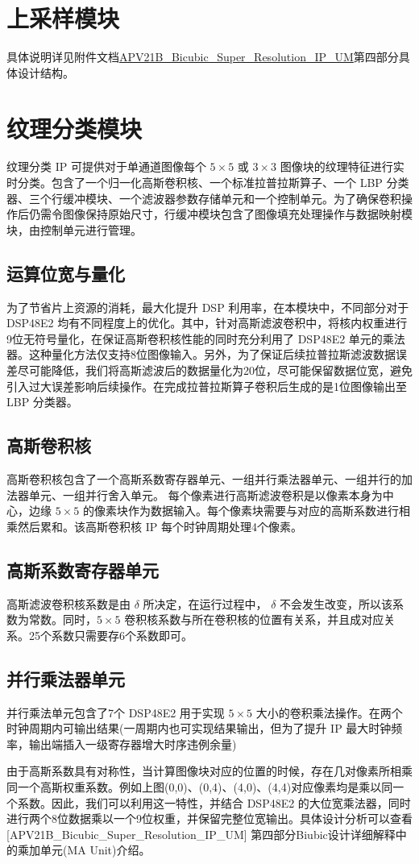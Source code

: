\documentclass[12pt, a4paper, oneside]{ctexbook}
\begin{document}
	\chapter{上采样模块}
	具体说明详见附件文档\href{run:./pic/APV21B_Bicubic_Super_Resolution_IP_UM.pdf}{APV21B\_Bicubic\_Super\_Resolution\_IP\_UM}第四部分具体设计结构。
	
	\chapter{纹理分类模块}
	纹理分类 IP 可提供对于单通道图像每个 $5\times5$ 或 $3\times3$ 图像块的纹理特征进行实时分类。包含了一个归一化高斯卷积核、一个标准拉普拉斯算子、一个 LBP 分类器、三个行缓冲模块、一个滤波器参数存储单元和一个控制单元。为了确保卷积操作后仍需令图像保持原始尺寸，行缓冲模块包含了图像填充处理操作与数据映射模块，由控制单元进行管理。
	\section{运算位宽与量化}
	为了节省片上资源的消耗，最大化提升 DSP 利用率，在本模块中，不同部分对于 DSP48E2 均有不同程度上的优化。其中，针对高斯滤波卷积中，将核内权重进行9位无符号量化，在保证高斯卷积核性能的同时充分利用了 DSP48E2 单元的乘法器。这种量化方法仅支持8位图像输入。另外，为了保证后续拉普拉斯滤波数据误差尽可能降低，我们将高斯滤波后的数据量化为20位，尽可能保留数据位宽，避免引入过大误差影响后续操作。在完成拉普拉斯算子卷积后生成的是1位图像输出至 LBP 分类器。
	\section{高斯卷积核}
	高斯卷积核包含了一个高斯系数寄存器单元、一组并行乘法器单元、一组并行的加法器单元、一组并行舍入单元。
	每个像素进行高斯滤波卷积是以像素本身为中心，边缘 $5\times5$ 的像素块作为数据输入。每个像素块需要与对应的高斯系数进行相乘然后累和。该高斯卷积核 IP 每个时钟周期处理4个像素。
	\section{高斯系数寄存器单元}
	高斯滤波卷积核系数是由 $\delta$ 所决定，在运行过程中， $\delta$ 不会发生改变，所以该系数为常数。同时，$5\times5$ 卷积核系数与所在卷积核的位置有关系，并且成对应关系。25个系数只需要存6个系数即可。
	\section{并行乘法器单元}
	并行乘法单元包含了7个 DSP48E2 用于实现 $5\times5$ 大小的卷积乘法操作。在两个时钟周期内可输出结果(一周期内也可实现结果输出，但为了提升 IP 最大时钟频率，输出端插入一级寄存器增大时序违例余量)\par 由于高斯系数具有对称性，当计算图像块对应的位置的时候，存在几对像素所相乘同一个高斯权重系数。例如上图(0,0)、(0,4)、(4,0)、(4,4)对应像素均是乘以同一个系数。因此，我们可以利用这一特性，并结合 DSP48E2 的大位宽乘法器，同时进行两个8位数据乘以一个9位权重，并保留完整位宽输出。具体设计分析可以查看[APV21B\_Bicubic\_Super\_Resolution\_IP\_UM] 第四部分Biubic设计详细解释中的乘加单元(MA Unit)介绍。%
\end{document}
